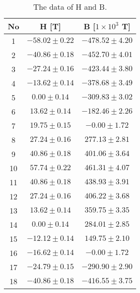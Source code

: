 \begin{table}[!h]
\begin{center}
\begin{tabular}{|c|c|c|}
\hline
No & H [T] & B [$1\times10^3$ T] \\
\hline
1	&	$-58.02\pm	0.22$	&	$-478.52\pm	4.20$	\\
\hline
2	&	$-40.86\pm	0.18$	&	$-452.70\pm	4.01$	\\
\hline
3	&	$-27.24\pm	0.16$	&	$-423.44\pm	3.80$	\\
\hline
4	&	$-13.62\pm	0.14$	&	$-378.68\pm	3.49$	\\
\hline
5	&	$0.00\pm	0.14$	&	$-309.83\pm	3.02$	\\
\hline
6	&	$13.62\pm	0.14$	&	$-182.46\pm	2.26$	\\
\hline
7	&	$19.75\pm	0.15$	&	$-0.00\pm	1.72$	\\
\hline
8	&	$27.24\pm	0.16$	&	$277.13\pm	2.81$	\\
\hline
9	&	$40.86\pm	0.18$	&	$401.06\pm	3.64$	\\
\hline
10	&	$57.74\pm	0.22$	&	$461.31\pm	4.07$	\\
\hline
11	&	$40.86\pm	0.18$	&	$438.93\pm	3.91$	\\
\hline
12	&	$27.24\pm	0.16$	&	$406.22\pm	3.68$	\\
\hline
13	&	$13.62\pm	0.14$	&	$359.75\pm	3.35$	\\
\hline
14	&	$0.00\pm	0.14$	&	$284.01\pm	2.85$	\\
\hline
15	&	$-12.12\pm	0.14$	&	$149.75\pm	2.10$	\\
\hline
16	&	$-16.62\pm	0.14$	&	$-0.00\pm	1.72$	\\
\hline
17	&	$-24.79\pm	0.15$	&	$-290.90\pm	2.90$	\\
\hline
18	&	$-40.86\pm	0.18$	&	$-416.55\pm	3.75$	\\
\hline
\end{tabular}
\caption{The data of H and B.}
\label{tab-3}
\end{center}
\end{table}
